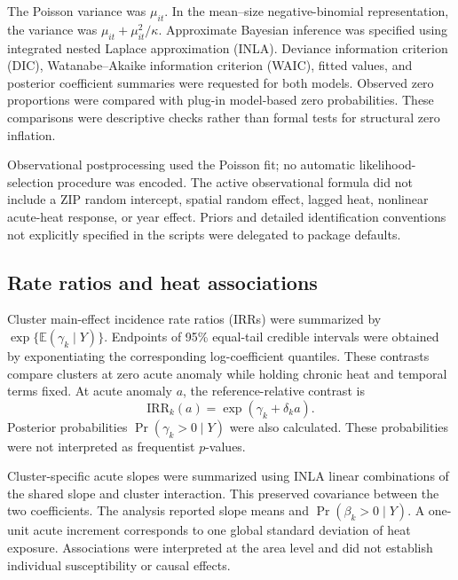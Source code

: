 \documentclass[11pt,letterpaper]{article}
\newcommand{\E}{\mathbb{E}}
\newcommand{\Prob}{\operatorname{Pr}}
\begin{document}
The Poisson variance was \(\mu_{it}\). In the mean--size negative-binomial representation, the variance was \(\mu_{it}+\mu_{it}^2/\kappa\). Approximate Bayesian inference was specified using integrated nested Laplace approximation (INLA). Deviance information criterion (DIC), Watanabe--Akaike information criterion (WAIC), fitted values, and posterior coefficient summaries were requested for both models. Observed zero proportions were compared with plug-in model-based zero probabilities. These comparisons were descriptive checks rather than formal tests for structural zero inflation.

Observational postprocessing used the Poisson fit; no automatic likelihood-selection procedure was encoded. The active observational formula did not include a ZIP random intercept, spatial random effect, lagged heat, nonlinear acute-heat response, or year effect. Priors and detailed identification conventions not explicitly specified in the scripts were delegated to package defaults.

\subsection{Rate ratios and heat associations}
Cluster main-effect incidence rate ratios (IRRs) were summarized by \(\exp\{\E(\gamma_k\mid Y)\}\). Endpoints of 95\% equal-tail credible intervals were obtained by exponentiating the corresponding log-coefficient quantiles. These contrasts compare clusters at zero acute anomaly while holding chronic heat and temporal terms fixed. At acute anomaly \(a\), the reference-relative contrast is
\begin{equation}
\mathrm{IRR}_k(a)=\exp(\gamma_k+\delta_k a).
\end{equation}
Posterior probabilities \(\Prob(\gamma_k>0\mid Y)\) were also calculated. These probabilities were not interpreted as frequentist \(p\)-values.

Cluster-specific acute slopes were summarized using INLA linear combinations of the shared slope and cluster interaction. This preserved covariance between the two coefficients. The analysis reported slope means and \(\Prob(\beta_k>0\mid Y)\). A one-unit acute increment corresponds to one global standard deviation of heat exposure. Associations were interpreted at the area level and did not establish individual susceptibility or causal effects.
\end{document}
